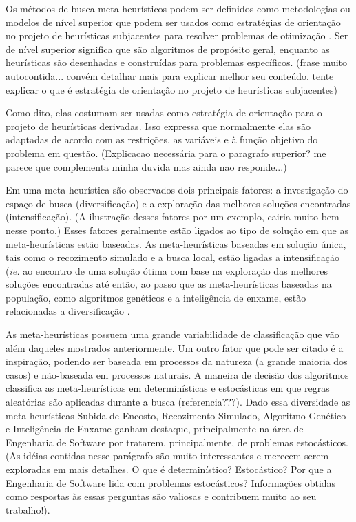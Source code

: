 Os métodos de busca meta-heurísticos podem ser definidos como metodologias ou modelos de nível superior que podem ser usados como estratégias de orientação no projeto de heurísticas subjacentes para resolver problemas de otimização \cite{talbi2009metaheuristics}. Ser de nível superior significa que são algoritmos de propósito geral, enquanto as heurísticas são desenhadas e construídas para  problemas específicos. (frase muito autocontida... convém detalhar mais para explicar melhor seu conteúdo. tente explicar o que é estratégia de orientação no projeto de heurísticas subjacentes)

Como dito, elas costumam ser usadas como estratégia de orientação para o projeto de heurísticas derivadas. Isso expressa que normalmente elas são adaptadas de acordo com as restrições, as variáveis e à função objetivo do problema em questão. (Explicacao necessária para o paragrafo superior? me parece que complementa minha duvida mas ainda nao responde...)

Em uma meta-heurística são observados dois principais fatores: a investigação do espaço de busca (diversificação) e a exploração das melhores soluções encontradas (intensificação). (A ilustração desses fatores por um exemplo, cairia muito bem nesse ponto.) Esses fatores geralmente estão ligados ao tipo de solução em que as meta-heurísticas estão baseadas. As meta-heurísticas baseadas em solução única, tais como o recozimento simulado e a busca local, estão ligadas a intensificação (\textit{ie.} ao encontro de uma solução ótima com base na exploração das melhores soluções encontradas até então, ao passo que as meta-heurísticas baseadas na população, como algoritmos genéticos e a inteligência de enxame, estão relacionadas a diversificação \cite{talbi2009metaheuristics}.

As meta-heurísticas possuem uma grande variabilidade de classificação que vão além daqueles mostrados anteriormente. Um outro fator que pode ser citado é a inspiração, podendo ser baseada em processos da natureza (a grande maioria dos casos) e não-baseada em processos naturais. A maneira de decisão dos algoritmos classifica as meta-heurísticas em determinísticas e estocásticas em que regras aleatórias são aplicadas durante a busca (referencia???). Dado essa diversidade as meta-heurísticas Subida de Encosto, Recozimento Simulado,  Algoritmo Genético e Inteligência de Enxame ganham destaque, principalmente na área de Engenharia de Software \cite{khari2017extensive} por tratarem, principalmente, de problemas estocásticos. (As idéias contidas nesse parágrafo são muito interessantes e merecem serem exploradas em mais detalhes. O que é determinístico? Estocástico?  Por que a Engenharia de Software lida com problemas estocásticos? Informações obtidas como respostas às essas perguntas são valiosas e contribuem muito ao seu trabalho!).


